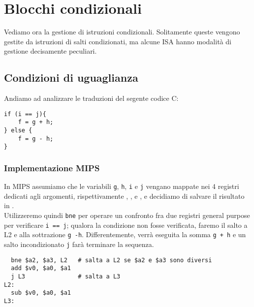 \documentclass[class=book, crop=false, oneside]{standalone}
\begin{document}
\section{Blocchi condizionali}
Vediamo ora la gestione di istruzioni condizionali. Solitamente queste vengono gestite da istruzioni di salti condizionati, ma alcune ISA hanno modalità di gestione decisamente peculiari.
\subsection*{Condizioni di uguaglianza}
Andiamo ad analizzare le traduzioni del segente codice C:
\begin{verbatim}
if (i == j){
	f = g + h;
} else {
	f = g - h;
}
\end{verbatim}
\subsubsection{Implementazione MIPS}
In MIPS assumiamo che le variabili \texttt{g}, \texttt{h}, \texttt{i} e \texttt{j} vengano mappate nei 4 registri dedicati agli argomenti, rispettivamente , ,  e , e decidiamo di salvare il risultato in .\\
Utilizzeremo quindi \texttt{bne} per operare un confronto fra due registri general purpose per verificare \texttt{i == j}; qualora la condizione non fosse verificata, faremo il salto a L2 e alla sottrazione \texttt{g -h}. Differentemente, verrà eseguita la somma \texttt{g + h} e un salto incondizionato \texttt{j} farà terminare la sequenza.
\begin{verbatim}
  bne $a2, $a3, L2   # salta a L2 se $a2 e $a3 sono diversi
  add $v0, $a0, $a1
  j L3               # salta a L3
L2:
  sub $v0, $a0, $a1
L3:
\end{verbatim}
\end{document}
